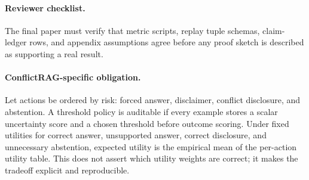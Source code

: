 \paragraph{Reviewer checklist.} The final paper must verify that metric scripts, replay tuple schemas, claim-ledger rows, and appendix assumptions agree before any proof sketch is described as supporting a real result.

\paragraph{ConflictRAG-specific obligation.}
Let actions be ordered by risk: forced answer, disclaimer, conflict disclosure, and abstention. A threshold policy is auditable if every example stores a scalar uncertainty score and a chosen threshold before outcome scoring. Under fixed utilities for correct answer, unsupported answer, correct disclosure, and unnecessary abstention, expected utility is the empirical mean of the per-action utility table. This does not assert which utility weights are correct; it makes the tradeoff explicit and reproducible.
